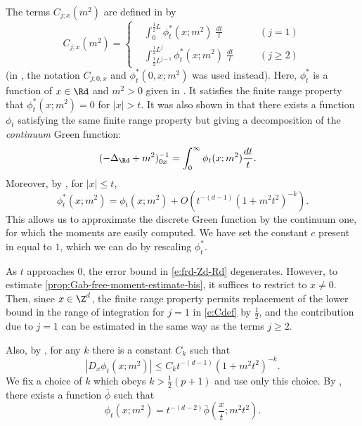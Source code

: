 The terms $C_{j;x}(m^2)$ are defined in \cite[Section~\ref{pt-sec:Cdecomp}]{BBS-rg-pt} by
\begin{equation} \label{e:Cdef}
  C_{j;x}(m^2) = \left\{\begin{aligned}
      &\int_{0}^{\frac{1}{2} L}  \phi_{t}^*(x; m^2) \; \frac{dt}{t}
      &\quad& (j=1)
      \\
      &\int_{\frac{1}{2} L^{j-1}}^{\frac{1}{2} L^{j}}  \phi_{t}^*(x; m^2) \; \frac{dt}{t}
      && (j\ge 2)
    \end{aligned}\right.
\end{equation}
(in \cite{BBS-rg-pt}, the notation $C_{j;0,x}$ and $\phi^*_t(0, x; m^2)$ was used instead).
Here, $\phi_t^*$ is a function of $x \in \Rd$ and $m^2 > 0$ given in
\cite[Example 1.1]{Baue13a}. It satisfies the finite range property that
$\phi_t^*(x; m^2) = 0$ for $|x| > t$.
It was also shown in \cite{Baue13a} that there exists a function $\phi_t$
satisfying the same finite range property but giving a decomposition of the
\emph{continuum} Green function:
\begin{align}
\label{e:frd-cont-int}
    (-\Delta_{\Rd} + m^2)^{-1}_{0x}
    &=
    \int_0^\infty \phi_t(x; m^2) \frac{dt}{t} .
\end{align}
Moreover, by \cite[(1.37)]{Baue13a}, for $|x| \leq t$,
\begin{equation}
\label{e:frd-Zd-Rd}
\phi^*_t(x; m^2) = \phi_t(x; m^2) + O(t^{-(d-1)} (1 + m^2 t^2)^{-k}).
\end{equation}
This allows us to approximate the discrete Green function by the continuum one, for which the moments are easily computed.
We have set the constant $c$ present in \cite{Baue13a} equal to $1$, which we can do by rescaling $\phi_t^*$.

As $t$ approaches $0$, the error bound in \eqref{e:frd-Zd-Rd} degenerates.
However, to estimate \eqref{prop:Gab-free-moment-estimate-bis}, it suffices to
restrict to $x \neq 0$.
Then, since $x \in \Z^d$, the finite range property permits replacement of the lower bound
in the range of integration for $j=1$ in \eqref{e:Cdef} by $\frac12$, and the contribution
due to $j=1$ can be estimated in the same way as the terms $j\geq 2$.

Also, by \cite[(1.34)]{Baue13a}, for any $k$ there is a constant $C_k$ such that
\begin{equation}
\label{e:frd-deriv-est}
|D_x \phi_t(x; m^2)| \leq C_k t^{-(d - 1)} (1 + m^2 t^2)^{-k}.
\end{equation}
We fix a choice of $k$ which obeys $k > \frac 12 (p+1)$ and use only this choice.
By \cite[(1.38)]{Baue13a}, there exists a function $\bar\phi$ such that
\begin{equation}
\label{e:frd-scaling}
\phi_t(x; m^2) = t^{-(d - 2)} \bar\phi\left(\frac{x}{t}; m^2 t^2\right).
\end{equation}

